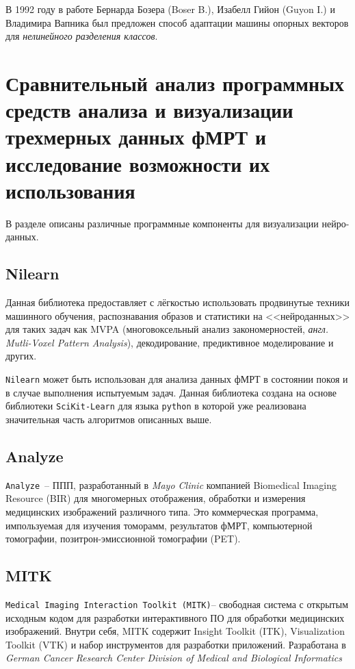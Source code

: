 В 1992 году в работе Бернарда Бозера (Boser B.), Изабелл Гийон (Guyon I.) и Владимира Вапника был предложен способ адаптации машины опорных векторов для \emph{нелинейного разделения классов}.

\section{Сравнительный анализ программных средств анализа и визуализации трехмерных данных фМРТ и исследование возможности их использования}

\begin{annotation}
	В разделе описаны  различные программные компоненты для визуализации нейро-данных.
\end{annotation}

\subsection*{Nilearn}
Данная библиотека предоставляет с лёгкостью использовать продвинутые техники машинного обучения, распознавания образов и статистики на <<нейроданных>> для таких задач как MVPA (многовоксельный анализ закономерностей, \textit{англ. Mutli-Voxel Pattern Analysis}), декодирование, предиктивное моделирование и других.

\texttt{Nilearn} может быть использован для анализа данных фМРТ в состоянии покоя и в случае выполнения испытуемым задач. Данная библиотека создана на основе библиотеки \texttt{SciKit-Learn} для языка \texttt{python} в которой уже реализована значительная часть алгоритмов описанных выше.

\subsection*{Analyze}
\texttt{Analyze}~-- ППП, разработанный в \textit{Mayo Clinic} компанией Biomedical Imaging Resource (BIR) для многомерных отображения, обработки и измерения медицинских изображений различного типа. Это коммерческая программа, импользуемая для изучения томорамм, результатов фМРТ, компьютерной томографии, позитрон-эмиссионной томографии (PET).

\subsection*{MITK}
\texttt{Medical Imaging Interaction Toolkit (MITK)}-- свободная система с открытым исходным кодом для разработки интерактивного
ПО для обработки медицинских изображений. Внутри себя, MITK содержит Insight Toolkit (ITK), Visualization Toolkit (VTK) и набор инструментов для разработки приложений. Разработана в \textit{German Cancer Research Center
Division of Medical and Biological Informatics}

